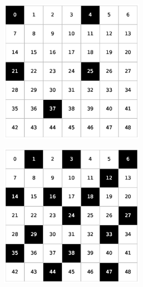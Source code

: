 \begin{figure}[h!]
\begin{subfigure}[b]{\textwidth}
\begin{subfigure}[b]{0.20\textwidth}
            \includegraphics[width=\columnwidth]{images/Tai49c_7x7_10.eps}
        \end{subfigure}
        \hspace{3em}
        \begin{subfigure}[b]{0.20\textwidth}
            \includegraphics[width=\columnwidth]{images/Tai49c_7x7_30.eps}

\end{subfigure}
\end{subfigure}
\end{figure}
